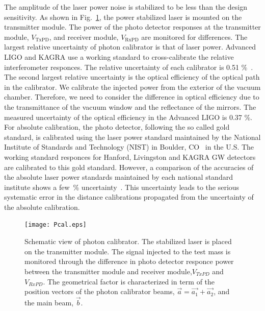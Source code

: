 \documentclass[%
 reprint,
superscriptaddress,
 amsmath,amssymb,
 aps,
]{revtex4-1}
\begin{document}
The amplitude of the laser power noise is stabilized to be less than the design sensitivity. As shown in Fig.~\ref{fig:Pcal}, the power stabilized laser is mounted on the transmitter module. The power of the photo detector responses at the transmitter module, $V_{\mathrm{TxPD}}$, and receiver module, $V_{\mathrm{RxPD}}$ are monitored for differences.  
The largest relative %
uncertainty of photon calibrator is that of laser power.
Advanced LIGO and KAGRA use a working standard to cross-calibrate the relative interferometer responces. The relative uncertainty of each calibrator is 0.51 \%~\cite{doi:10.1063/1.4967303}. 
The second largest relative uncertainty is the optical efficiency of the optical path in the calibrator. We calibrate the injected power from the exterior of the vacuum chamber. Therefore, we need to consider the difference in optical efficiency due to the transmittance of the vacuum window and the reflectance of the mirrors. The measured uncertainty of the optical efficiency in the Advanced LIGO is 0.37 \%. 
For absolute calibration, the photo detector, following the so called gold standard, is calibrated using the laser power standard maintained by the National Institute of Standards and Technology (NIST) in Boulder, CO~\cite{taylor:1994:GEEU} in the U.S. 
The working standard responces for Hanford, Livingston and KAGRA GW detectors are calibrated to this gold standard. 
However, a comparison of the accuracies of the absolute laser power standards maintained by each national standard institute shows a few~\% 
uncertainty~\cite{EUROMET}. %
 This uncertainty leads to the serious systematic error in the distance calibrations propagated from the uncertainty of the absolute calibration.

\begin{figure}
\begin{center}
\texttt{[image: Pcal.eps]}
\caption{Schematic view of photon calibrator. The stabilized laser is placed on the transmitter module. The signal injected to the test mass is monitored through the difference in photo detector responce power between the transmitter module and  receiver module,$V_{TxPD}$  and $V_{RxPD}$. The geometrical factor is characterized in term of the position vectors of the photon calibrator beams, $\vec{a}=\vec{a_1}+\vec{a_2}$, and the main beam, $\vec{b}$.}
\label{fig:Pcal}
\end{center}
\end{figure}
\end{document}
